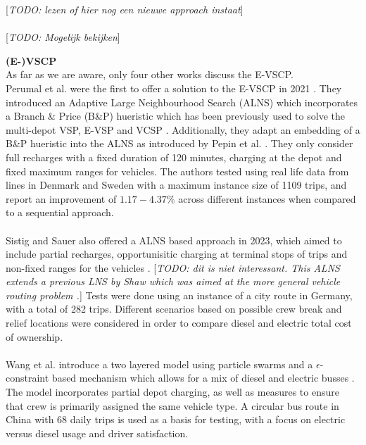 \documentclass[]{article}
\newcommand{\todo}[1]{{\color{red}[\textit{TODO: #1}]}}
\begin{document}
\todo{lezen of hier nog een nieuwe approach instaat} \cite{Sassi2014} \\\\
\todo{Mogelijk bekijken} \cite{Parmentier2023}

\noindent \textbf{(E-)VSCP}\\
As far as we are aware, only four other works discuss the E-VSCP.\\
Perumal et al. were the first to offer a solution to the E-VSCP in 2021 \cite{PERUMAL2021105268}. They introduced an Adaptive Large Neighbourhood Search (ALNS) which incorporates a Branch \& Price (B\&P) hueristic which has been previously used to solve the multi-depot VSP, E-VSP and VCSP \cite{Pepin2009, Haase1996, vanKootenNiekerk2017}. Additionally, they adapt an embedding of a B\&P hueristic into the ALNS as introduced by Pepin et al. \cite{Pepin2009}. They only consider full recharges with a fixed duration of 120 minutes, charging at the depot and fixed maximum ranges for vehicles. The authors tested using real life data from lines in Denmark and Sweden with a maximum instance size of 1109 trips, and report an improvement of $1.17-4.37\%$ across different instances when compared to a sequential approach. \\\\

Sistig and Sauer also offered a ALNS based approach in 2023, which aimed to include partial recharges, opportunisitic charging at terminal stops of trips and non-fixed ranges for the vehicles \cite{SISTIG2023120915}. \todo{dit is niet interessant. This ALNS extends a previous LNS by Shaw which was aimed at the more general vehicle routing problem \cite{Shaw1997ANL, Shaw1998ANL}.} Tests were done using an instance of a city route in Germany, with a total of 282 trips. Different scenarios based on possible crew break and relief locations were considered in order to compare diesel and electric total cost of ownership. \\\\

Wang et al. introduce a two layered model using particle swarms and a $\epsilon$-constraint based mechanism which allows for a mix of diesel and electric busses \cite{su14063627}. The model incorporates partial depot charging, as well as measures to ensure that crew is primarily assigned the same vehicle type. A circular bus route in China with 68 daily trips is used as a basis for testing, with a focus on electric versus diesel usage and driver satisfaction. \\\\
\end{document}

